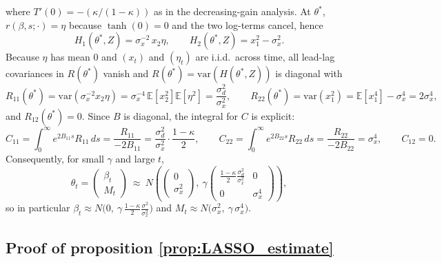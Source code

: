 where $T'(0)=-(\kappa/(1-\kappa))$ as in the decreasing-gain analysis. At $\theta^*$, $r(\beta,s;\cdot)=\eta$ because $\tanh(0)=0$ and the two log-terms cancel, hence
\[
H_1(\theta^*,Z)=\sigma_x^{-2}\,x_2\eta,\qquad H_2(\theta^*,Z)=x_1^2-\sigma_x^2.
\]
Because $\eta$ has mean $0$ and $(x_t)$ and $(\eta_t)$ are i.i.d.\ across time, all lead-lag covariances in $R(\theta^*)$ vanish and $R(\theta^*)=\mathrm{var}(H(\theta^*,Z))$ is diagonal with
\[
R_{11}(\theta^*)=\mathrm{var}(\sigma_x^{-2}x_2\eta)=\sigma_x^{-4}\,\mathbb E[x_2^2]\mathbb E[\eta^2]=\frac{\sigma_d^2}{\sigma_x^{2}},\qquad
R_{22}(\theta^*)=\mathrm{var}(x_1^2)=\mathbb E[x_1^4]-\sigma_x^4=2\sigma_x^4,
\]
and $R_{12}(\theta^*)=0$. Since $B$ is diagonal, the integral for $C$ is explicit:
\[
C_{11}=\int_0^\infty e^{2B_{11}s}R_{11}\,ds=\frac{R_{11}}{-2B_{11}}=\frac{\sigma_d^2}{\sigma_x^{2}}\cdot\frac{1-\kappa}{2},\qquad
C_{22}=\int_0^\infty e^{2B_{22}s}R_{22}\,ds=\frac{R_{22}}{-2B_{22}}=\sigma_x^4,
\qquad C_{12}=0.
\]
Consequently, for small $\gamma$ and large $t$,
\[
\theta_t=
\begin{pmatrix}\beta_t\\ M_t\end{pmatrix}
\ \approx\ 
N\!\left(
\begin{pmatrix}0\\ \sigma_x^2\end{pmatrix},
\ \gamma
\begin{pmatrix}
\displaystyle \frac{1-\kappa}{2}\frac{\sigma_d^2}{\sigma_x^{2}} & 0\\[8pt]
0 & \sigma_x^4
\end{pmatrix}
\right),
\]
so in particular $\beta_t\approx N\!\bigl(0,\ \gamma\,\frac{1-\kappa}{2}\frac{\sigma^2}{\sigma_x^{2}}\bigr)$ and $M_t\approx N\!\bigl(\sigma_x^2,\ \gamma\,\sigma_x^4\bigr)$.

\subsection{Proof of proposition \ref{prop:LASSO_estimate}}  \label{app:proof_LASSO}

